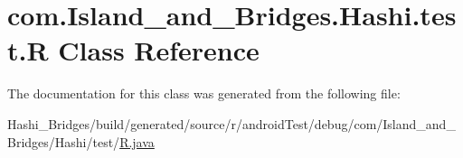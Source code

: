 \hypertarget{classcom_1_1_island__and___bridges_1_1_hashi_1_1test_1_1_r}{}\section{com.\+Island\+\_\+and\+\_\+\+Bridges.\+Hashi.\+test.\+R Class Reference}
\label{classcom_1_1_island__and___bridges_1_1_hashi_1_1test_1_1_r}


The documentation for this class was generated from the following file\+:\begin{DoxyCompactItemize}
\item 
Hashi\+\_\+\+Bridges/build/generated/source/r/android\+Test/debug/com/\+Island\+\_\+and\+\_\+\+Bridges/\+Hashi/test/\mbox{\hyperlink{android_test_2debug_2com_2_island__and___bridges_2_hashi_2test_2_r_8java}{R.\+java}}\end{DoxyCompactItemize}
